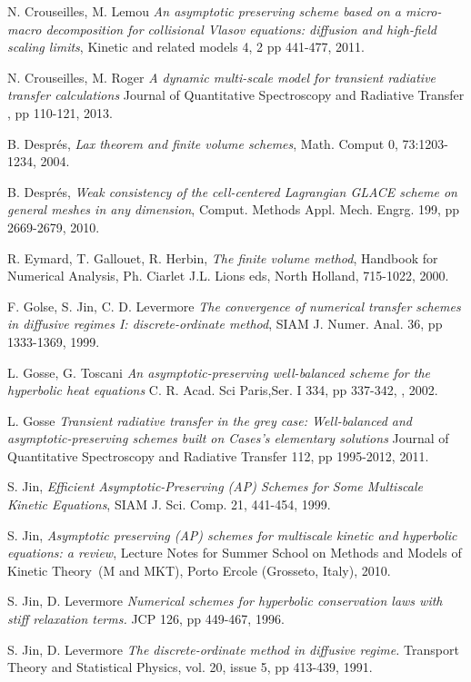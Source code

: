 \documentclass[a4paper,french,english,10pt]{article}
\begin{document}
{\begin{thebibliography}{abcde}
 N. Crouseilles, M. Lemou \emph{An asymptotic preserving
scheme based on a micro-macro decomposition for collisional Vlasov equations:
diffusion and high-field scaling limits}, Kinetic and related models 4, 2 
pp 441-477, 2011.

 N. Crouseilles, M. Roger \emph{A dynamic multi-scale
model for transient radiative transfer calculations} Journal of Quantitative
Spectroscopy and Radiative Transfer , pp 110-121, 2013.

 B. Despr\'es,  \emph{Lax theorem and finite volume
schemes},
Math. Comput 0, 73:1203-1234, 2004.

 B. Despr\'es,  \emph{Weak consistency of the cell-centered
Lagrangian GLACE scheme on general
meshes in any dimension}, Comput. Methods Appl. Mech. Engrg. 199, pp 
2669-2679, 2010.

 R. Eymard, T. Gallouet, R. Herbin, \emph{The finite volume
method}, Handbook for Numerical Analysis, Ph. Ciarlet J.L. Lions eds, North
Holland, 715-1022, 2000.


 F. Golse, S. Jin, C. D. Levermore \emph{The convergence
of numerical transfer schemes in diffusive regimes I: discrete-ordinate method},
SIAM J. Numer. Anal. 36, pp 1333-1369, 1999.

 L. Gosse, G. Toscani \emph{An asymptotic-preserving
well-balanced scheme for the hyperbolic heat equations} C. R. Acad. Sci
Paris,Ser. I 334, pp  337-342, , 2002.

 L. Gosse \emph{Transient radiative transfer in the grey
case: Well-balanced and asymptotic-preserving schemes built on Cases's
elementary solutions} Journal of Quantitative Spectroscopy and Radiative
Transfer 112, pp 1995-2012, 2011.

 S. Jin, \emph{Efficient Asymptotic-Preserving (AP)
Schemes for Some Multiscale Kinetic Equations},  SIAM J. Sci. Comp. 21, 441-454,
1999.

 S. Jin, \emph{Asymptotic preserving (AP) schemes for
multiscale kinetic and hyperbolic equations: a review}, Lecture Notes for Summer
School on \og Methods and Models of Kinetic Theory\fg\, (M and MKT), Porto
Ercole (Grosseto, Italy),  2010.

 S. Jin, D. Levermore \emph{Numerical schemes for
hyperbolic conservation laws with stiff relaxation terms.} JCP 126, pp 449-467,
1996.

 S. Jin, D. Levermore \emph{The discrete-ordinate method in
diffusive regime.} Transport Theory and Statistical Physics, vol. 20, issue 5,
pp 413-439, 1991.



\end{thebibliography}}
\end{document}
